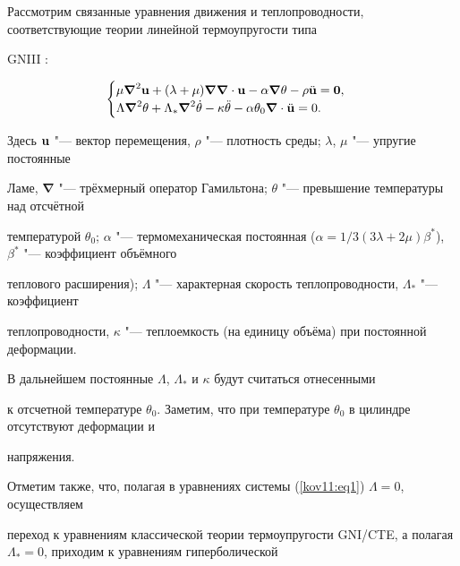  Рассмотрим связанные уравнения движения и теплопроводности, соответствующие теории линейной термоупругости типа

GNIII \cite{kov11:1}:

\begin{equation}

\label{kov11:eq1}

\begin{cases}

\mu \boldsymbol\nabla ^2 {\bf{u}} + (\lambda  + \mu )\boldsymbol\nabla \boldsymbol\nabla  \cdot {\bf{u}} -

\alpha \boldsymbol\nabla \theta  - \rho \ddot{\bf{u}} = {\bf{0}}, \\

\Lambda \boldsymbol\nabla ^2 \theta  + \Lambda _* \boldsymbol\nabla ^2 \dot \theta  - \kappa \ddot \theta  -

\alpha \theta _0 \boldsymbol\nabla  \cdot \ddot{\bf{u}} = 0.

\end{cases}

\end{equation}

Здесь ${\bf{u}}$ "--- вектор перемещения,   $\rho$ "--- плотность среды;  $\lambda$, $\mu$ "--- упругие постоянные

Ламе, $\boldsymbol\nabla$ "--- трёхмерный оператор Гамильтона; $\theta$ "--- превышение температуры над отсчётной

температурой $\theta _0$;  $\alpha$ "--- термомеханическая постоянная ($\alpha  = 1/3(3\lambda  + 2\mu )\beta^* $), $\beta^*$ "--- коэффициент объёмного

теплового расширения); $\Lambda$ "--- характерная  скорость теплопроводности,  $\Lambda_*$ "--- коэффициент

теплопроводности, $\kappa$ "--- теплоемкость (на единицу объёма) при постоянной деформации.

В дальнейшем постоянные $\Lambda$, $\Lambda_*$ и $\kappa$ будут считаться отнесенными

к отсчетной температуре $\theta_0$. Заметим, что при температуре $\theta_0$ в цилиндре отсутствуют деформации и

напряжения.



Отметим также, что, полагая в уравнениях системы (\ref{kov11:eq1}) $\Lambda=0$, осуществляем

переход к уравнениям классической теории термоупругости GNI/CTE, а полагая $\Lambda_*=0$, приходим к уравнениям гиперболической

